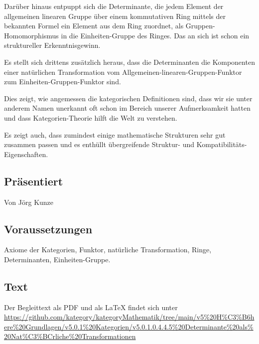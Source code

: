 \documentclass[a4paper]{amsart}
\theoremstyle{definition}
\begin{document}
Darüber hinaus entpuppt sich die Determinante, die jedem Element der allgemeinen linearen Gruppe über einem kommutativen Ring mittels der bekannten Formel ein Element aus dem Ring zuordnet, als Gruppen-Homomorphismus in die Einheiten-Gruppe des Ringes. Das an sich ist schon ein struktureller Erkenntnisgewinn.

Es stellt sich drittens zusätzlich heraus, dass die Determinanten die Komponenten einer natürlichen Transformation vom Allgemeinen-linearen-Gruppen-Funktor zum Einheiten-Gruppen-Funktor sind.

Dies zeigt, wie angemessen die kategorischen Definitionen sind, dass wir sie unter anderem Namen unerkannt oft schon im Bereich unserer Aufmerksamkeit hatten und dass Kategorien-Theorie hilft die Welt zu verstehen.

Es zeigt auch, dass zumindest einige mathematische Strukturen sehr gut zusammen passen und es enthüllt übergreifende Struktur- und Kompatibilitäts-Eigenschaften.

\subsection*{Präsentiert}
Von Jörg Kunze

\subsection*{Voraussetzungen}
Axiome der Kategorien, Funktor, natürliche Transformation, Ringe, Determinanten, Einheiten-Gruppe.

\subsection*{Text}
Der Begleittext als PDF und als LaTeX findet sich unter
{\tiny
   \url{https://github.com/kategory/kategoryMathematik/tree/main/v5%20H%C3%B6here%20Grundlagen/v5.0.1%20Kategorien/v5.0.1.0.4.4.5%20Determinante%20als%20Nat%C3%BCrliche%20Transformationen}
}
\end{document}
